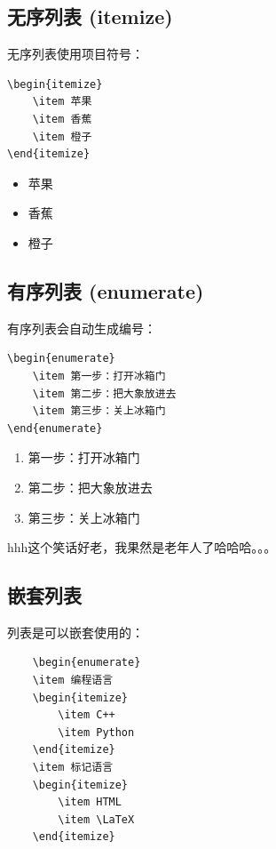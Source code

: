 \subsection{无序列表 (itemize)}
无序列表使用项目符号：
\begin{lstlisting}
\begin{itemize}
    \item 苹果
    \item 香蕉
    \item 橙子
\end{itemize}    
\end{lstlisting}
\begin{itemize}
    \item 苹果
    \item 香蕉
    \item 橙子
\end{itemize}

\subsection{有序列表 (enumerate)}
有序列表会自动生成编号：
\begin{lstlisting}
\begin{enumerate}
    \item 第一步：打开冰箱门
    \item 第二步：把大象放进去
    \item 第三步：关上冰箱门
\end{enumerate}
\end{lstlisting}
\begin{enumerate}
    \item 第一步：打开冰箱门
    \item 第二步：把大象放进去
    \item 第三步：关上冰箱门
\end{enumerate}
hhh这个笑话好老，我果然是老年人了哈哈哈。。。

\subsection{嵌套列表}
列表是可以嵌套使用的：
\begin{lstlisting}
    \begin{enumerate}
    \item 编程语言
    \begin{itemize}
        \item C++
        \item Python
    \end{itemize}
    \item 标记语言
    \begin{itemize}
        \item HTML
        \item \LaTeX
    \end{itemize}
    
\end{lstlisting}

